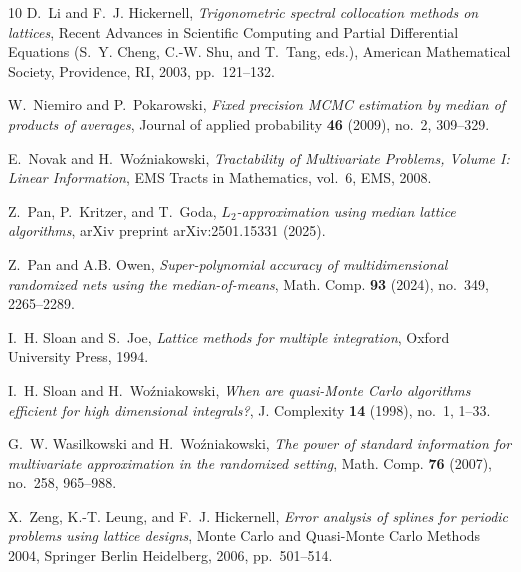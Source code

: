 \documentclass[a4paper,11pt]{article}
\begin{document}
\begin{thebibliography}{10}
D.~Li and F.~J. Hickernell, \emph{Trigonometric spectral collocation methods on lattices}, Recent {A}dvances in {S}cientific {C}omputing and {P}artial {D}ifferential {Equations} (S.~Y. Cheng, C.-W. Shu, and T.~Tang, eds.), American Mathematical Society, Providence, RI, 2003, pp.~121--132.

W.~Niemiro and P.~Pokarowski, \emph{Fixed precision {MCMC} estimation by median of products of averages}, Journal of applied probability \textbf{46} (2009), no.~2, 309--329.

E.~Novak and H.~Wo{\'z}niakowski, \emph{{Tractability of Multivariate Problems, Volume I: Linear Information}}, EMS Tracts in Mathematics, vol.~6, EMS, 2008.

Z.~Pan, P.~Kritzer, and T.~Goda, \emph{{$L_2$}-approximation using median lattice algorithms}, arXiv preprint arXiv:2501.15331 (2025).

Z.~Pan and A.B. Owen, \emph{{Super-polynomial accuracy of multidimensional randomized nets using the median-of-means}}, Math. Comp. \textbf{93} (2024), no.~349, 2265--2289.

I.~H. Sloan and S.~Joe, \emph{Lattice methods for multiple integration}, Oxford University Press, 1994.

I.~H. Sloan and H.~Wo{\'z}niakowski, \emph{{When are quasi-Monte Carlo algorithms efficient for high dimensional integrals?}}, J. Complexity \textbf{14} (1998), no.~1, 1--33.

G.~W. Wasilkowski and H.~Wo\'{z}niakowski, \emph{The power of standard information for multivariate approximation in the randomized setting}, Math. Comp. \textbf{76} (2007), no.~258, 965--988.

X.~Zeng, K.-T. Leung, and F.~J. Hickernell, \emph{Error analysis of splines for periodic problems using lattice designs}, Monte Carlo and Quasi-Monte Carlo Methods 2004, Springer Berlin Heidelberg, 2006, pp.~501--514.

\end{thebibliography}
\end{document}
